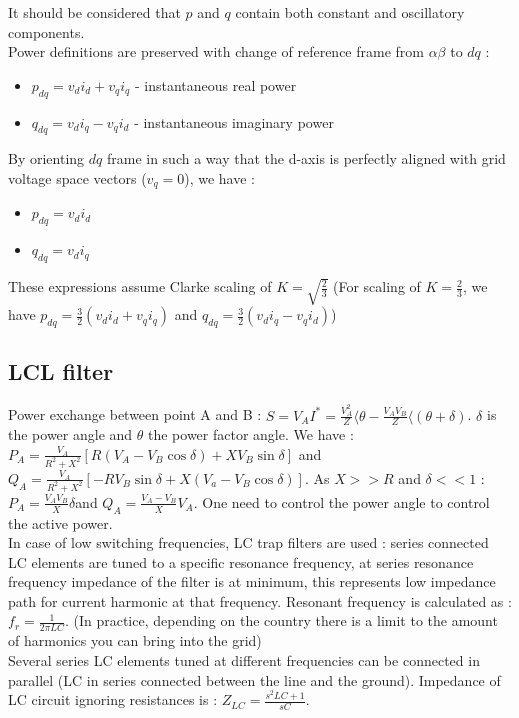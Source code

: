 \documentclass[../main.tex]{subfiles}
\begin{document}
It should be considered that $p$ and $q$ contain both constant and oscillatory components.\\

Power definitions are preserved with change of reference frame from $\alpha \beta$ to $dq$ : \begin{itemize}
    \item $p_{dq} = v_d i_d + v_q i_q$ - instantaneous real power
    \item $q_{dq} = v_d i_q - v_q i_d$ - instantaneous imaginary power
\end{itemize}
By orienting $dq$ frame in such a way that the d-axis is perfectly aligned with grid voltage space vectors ($v_q = 0$), we have : \begin{itemize}
    \item $p_{dq} = v_d i_d$
    \item $q_{dq} = v_d i_q$
\end{itemize}
These expressions assume Clarke scaling of $K = \sqrt{\frac{2}{3}}$ (For scaling of $K = \frac{2}{3}$, we have $p_{dq} = \frac{3}{2} (v_d i_d + v_q i_q)$ and $q_{dq} = \frac{3}{2} (v_d i_q - v_q i_d)$)\\

\subsection{LCL filter}
Power exchange between point A and B : $S = V_A I^* = \frac{V_A^2}{Z} \langle \theta - \frac{V_AV_B}{Z} \langle(\theta + \delta)$. $\delta$ is the power angle and $\theta$ the power factor angle. We have : $P_A = \frac{V_A}{R^2+X^2} [R(V_A-V_B \cos\delta) + XV_B \sin \delta]$ and $Q_A = \frac{V_A}{R^2+X^2} [-RV_B \sin \delta + X(V_a-V_B\cos\delta)]$. As $X>>R$ and $\delta<<1$ : $P_A = \frac{V_AV_B}{X} \delta$and $Q_A = \frac{V_A-V_B}{X}V_A$. One need to control the power angle to control the active power.\\

In case of low switching frequencies, LC trap filters are used : series connected LC elements are tuned to a specific resonance frequency, at series resonance frequency impedance of the filter is at minimum, this represents low impedance path for current harmonic at that frequency. Resonant frequency is calculated as : $f_r = \frac{1}{2\pi LC}$. (In practice, depending on the country there is a limit to the amount of harmonics you can bring into the grid)\\
Several series LC elements tuned at different frequencies can be connected in parallel (LC in series connected between the line and the ground). Impedance of LC circuit ignoring resistances is : $Z_{LC} = \frac{s^2 LC +1}{sC}$.
\end{document}
